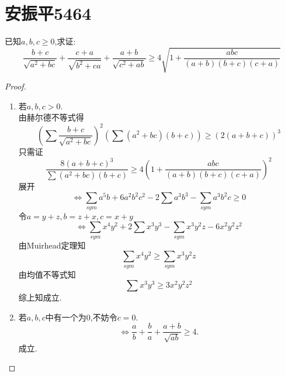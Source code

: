 \documentclass[]{article}
\title{}
\author{}
\date{}
\begin{document}
\section{安振平5464}{
已知$a,b,c\geq 0$,求证:
\begin{equation}\nonumber
    \frac{b+c}{\sqrt{a^2+bc}}+\frac{c+a}{\sqrt{b^2+ca}}+ \frac{a+b}{\sqrt{c^2+ab}}\geq 4\sqrt{1+\frac{abc}{(a+b)(b+c)(c+a)}}
\end{equation}

\begin{proof}
\begin{enumerate}
    \item 若$a,b,c>0$.\\
        由赫尔德不等式得
        \begin{equation}\nonumber
            (\sum\frac{b+c}{\sqrt{a^2+bc}})^2(\sum (a^2+bc)(b+c))\geq (2(a+b+c))^3
        \end{equation}
       只需证
       \begin{equation}\nonumber
           \frac{8(a+b+c)^3}{\sum (a^2+bc)(b+c)}\geq 4(1+\frac{abc}{(a+b)(b+c)(c+a)})^2
       \end{equation}
       展开
       \begin{equation}\nonumber
           \Longleftrightarrow \sum_{sym}a^5b+6a^2b^2c^2-2\sum a^3b^3-\sum_{sym}a^3b^2c\geq 0
       \end{equation}
       令$a=y+z,b=z+x,c=x+y$
       \begin{equation}\nonumber
           \Longleftrightarrow \sum_{sym}x^4y^2+2\sum x^3y^3-\sum_{sym}x^3y^2z-6x^2y^2z^2
       \end{equation}
       由Muirhead定理知
       \begin{equation}\nonumber
           \sum_{sym}x^4y^2\geq \sum_{sym}x^3y^2z
       \end{equation}
       由均值不等式知
       \begin{equation}\nonumber
           \sum x^3y^3\geq 3x^2y^2z^2
       \end{equation}
       综上知成立.
    \item 若$a,b,c$中有一个为$0$,不妨令$c=0$.
        \begin{equation}\nonumber
            \Longleftrightarrow \frac{a}{b}+\frac{b}{a}+\frac{a+b}{\sqrt{ab}}\geq 4.
        \end{equation}
        成立.
\end{enumerate}
\end{proof}
}
\end{document}
